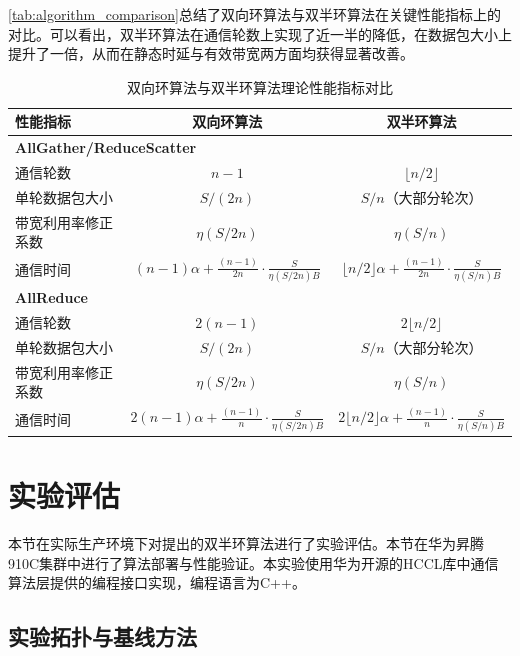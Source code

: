 \medskip

\autoref{tab:algorithm_comparison}总结了双向环算法与双半环算法在关键性能指标上的对比。可以看出，双半环算法在通信轮数上实现了近一半的降低，在数据包大小上提升了一倍，从而在静态时延与有效带宽两方面均获得显著改善。

\begin{table}[!htbp]
\centering
\caption{双向环算法与双半环算法理论性能指标对比}
\label{tab:algorithm_comparison}
\begin{tabular}{l c c}
\toprule
性能指标 & 双向环算法 & 双半环算法 \\
\midrule
\multicolumn{3}{l}{\textbf{AllGather/ReduceScatter}} \\
\quad 通信轮数 & $n-1$ & $\lfloor n/2\rfloor$ \\
\quad 单轮数据包大小 & $S/(2n)$ & $S/n$（大部分轮次） \\
\quad 带宽利用率修正系数 & $\eta(S/2n)$ & $\eta(S/n)$ \\
\quad 通信时间 & $(n-1)\alpha+\frac{(n-1)}{2n}\cdot\frac{S}{\eta(S/2n)B}$ & $\lfloor n/2\rfloor\alpha+\frac{(n-1)}{2n}\cdot\frac{S}{\eta(S/n)B}$ \\
\midrule
\multicolumn{3}{l}{\textbf{AllReduce}} \\
\quad 通信轮数 & $2(n-1)$ & $2\lfloor n/2\rfloor$ \\
\quad 单轮数据包大小 & $S/(2n)$ & $S/n$（大部分轮次） \\
\quad 带宽利用率修正系数 & $\eta(S/2n)$ & $\eta(S/n)$ \\
\quad 通信时间 & $2(n-1)\alpha+\frac{(n-1)}{n}\cdot\frac{S}{\eta(S/2n)B}$ & $2\lfloor n/2\rfloor\alpha+\frac{(n-1)}{n}\cdot\frac{S}{\eta(S/n)B}$ \\
\bottomrule
\end{tabular}
\end{table}



\section{实验评估}

本节在实际生产环境下对提出的双半环算法进行了实验评估。本节在华为昇腾910C集群中进行了算法部署与性能验证。本实验使用华为开源的HCCL库\cite{hccl_doc}中通信算法层提供的编程接口实现，编程语言为C++。

\subsection{实验拓扑与基线方法}

